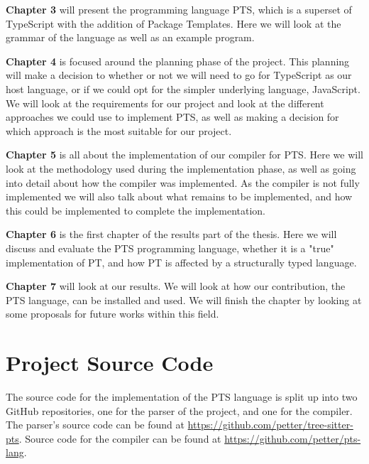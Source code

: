 \textbf{Chapter 3} will present the programming language PTS, which is a superset of TypeScript with the addition of Package Templates.
Here we will look at the grammar of the language as well as an example program.

\textbf{Chapter 4} is focused around the planning phase of the project.
This planning will make a decision to whether or not we will need to go for TypeScript as our host language, or if we could opt for the simpler underlying language, JavaScript.
We will look at the requirements for our project and look at the different approaches we could use to implement PTS, as well as making a decision for which approach is the most suitable for our project.

\textbf{Chapter 5} is all about the implementation of our compiler for PTS\@.
Here we will look at the methodology used during the implementation phase, as well as going into detail about how the compiler was implemented.
As the compiler is not fully implemented we will also talk about what remains to be implemented, and how this could be implemented to complete the implementation.

\textbf{Chapter 6} is the first chapter of the results part of the thesis.
Here we will discuss and evaluate the PTS programming language, whether it is a "true" implementation of PT, and how PT is affected by a structurally typed language.

\textbf{Chapter 7} will look at our results.
We will look at how our contribution, the PTS language, can be installed and used.
We will finish the chapter by looking at some proposals for future works within this field.

\section{Project Source Code}\label{sec:project-source-code}

The source code for the implementation of the PTS language is split up into two GitHub repositories, one for the parser of the project, and one for the compiler.
The parser's source code can be found at \url{https://github.com/petter/tree-sitter-pts}.
Source code for the compiler can be found at \url{https://github.com/petter/pts-lang}.
